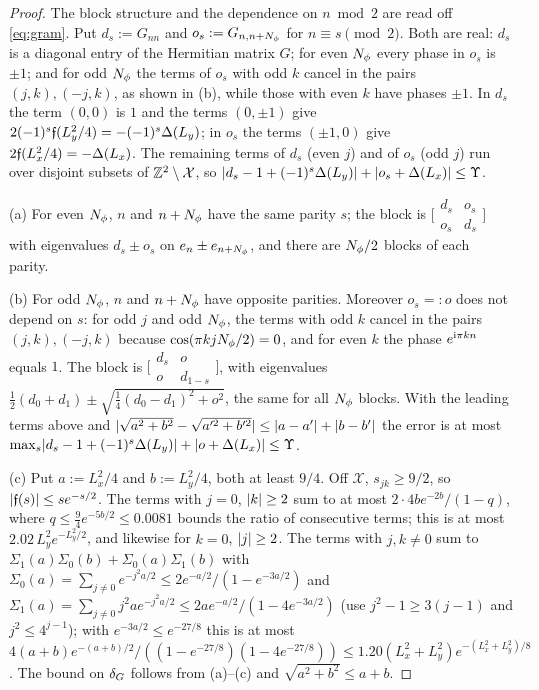 \begin{proof}
The block structure and the dependence on $n\bmod2$ are read off \eqref{eq:gram}. Put $d_s:=G_{nn}$ and
$o_s:=G_{n,n+N_{\phi}}$ for $n\equiv s\pmod2$. Both are real: $d_s$ is a diagonal entry of the Hermitian matrix $G$; for even
$N_{\phi}$ every phase in $o_s$ is $\pm1$; and for odd $N_{\phi}$ the terms of $o_s$ with odd $k$ cancel in the pairs $(j,k),(-j,k)$, as
shown in (b), while those with even $k$ have phases $\pm1$.
In $d_s$ the term $(0,0)$ is $1$ and the terms $(0,\pm1)$ give $2(-1)^s\mathfrak f(L_y^2/4)=-(-1)^s\Delta(L_y)$; in $o_s$ the terms
$(\pm1,0)$ give $2\mathfrak f(L_x^2/4)=-\Delta(L_x)$. The remaining terms of $d_s$ (even $j$) and of $o_s$ (odd $j$) run over disjoint
subsets of $\mathbb{Z}^2\setminus\mathcal X$, so $\lvert d_s-1+(-1)^s\Delta(L_y)\rvert+\lvert o_s+\Delta(L_x)\rvert\le\Upsilon$.

(a) For even $N_{\phi}$, $n$ and $n+N_{\phi}$ have the same parity $s$; the block is
$\bigl[\begin{smallmatrix}d_s&o_s\\o_s&d_s\end{smallmatrix}\bigr]$ with eigenvalues $d_s\pm o_s$ on $e_n\pm e_{n+N_{\phi}}$, and there are
$N_{\phi}/2$ blocks of each parity.

(b) For odd $N_{\phi}$, $n$ and $n+N_{\phi}$ have opposite parities. Moreover $o_s=:o$ does not depend on $s$: for odd $j$ and odd
$N_{\phi}$, the terms with odd $k$ cancel in the pairs $(j,k),(-j,k)$ because $\cos(\pi kjN_{\phi}/2)=0$, and for even $k$ the phase
$e^{\mathrm{i}\pi kn}$ equals $1$. The block is $\bigl[\begin{smallmatrix}d_s&o\\o&d_{1-s}\end{smallmatrix}\bigr]$, with eigenvalues
$\frac12(d_0+d_1)\pm\sqrt{\frac14(d_0-d_1)^2+o^2}$, the same for all $N_{\phi}$ blocks. With the leading terms above and
$\lvert\sqrt{a^2+b^2}-\sqrt{a'^2+b'^2}\rvert\le\lvert a-a'\rvert+\lvert b-b'\rvert$ the error is at most $\max_s\lvert d_s-1+(-1)^s\Delta(L_y)\rvert+\lvert o+\Delta(L_x)\rvert\le\Upsilon$.

(c) Put $a:=L_x^2/4$ and $b:=L_y^2/4$, both at least $9/4$. Off $\mathcal X$, $s_{jk}\ge9/2$, so $\lvert\mathfrak f(s)\rvert\le se^{-s/2}$. The
terms with $j=0$, $\lvert k\rvert\ge2$ sum to at most $2\cdot4be^{-2b}/(1-q)$, where $q\le\frac94e^{-5b/2}\le0.0081$ bounds the ratio of
consecutive terms; this is at most $2.02\,L_y^2e^{-L_y^2/2}$, and likewise for $k=0$, $\lvert j\rvert\ge2$. The terms with $j,k\neq0$ sum
to $\Sigma_1(a)\Sigma_0(b)+\Sigma_0(a)\Sigma_1(b)$ with $\Sigma_0(a)=\sum_{j\ne0}e^{-j^2a/2}\le2e^{-a/2}/(1-e^{-3a/2})$ and
$\Sigma_1(a)=\sum_{j\neq0}j^2ae^{-j^2a/2}\le2ae^{-a/2}/(1-4e^{-3a/2})$ (use $j^2-1\ge3(j-1)$ and $j^2\le4^{j-1}$); with $e^{-3a/2}\le e^{-27/8}$
this is at most $4(a+b)e^{-(a+b)/2}/((1-e^{-27/8})(1-4e^{-27/8}))\le1.20(L_x^2+L_y^2)e^{-(L_x^2+L_y^2)/8}$.
The bound on $\delta_G$ follows from (a)--(c) and $\sqrt{a^2+b^2}\le a+b$.
\end{proof}

